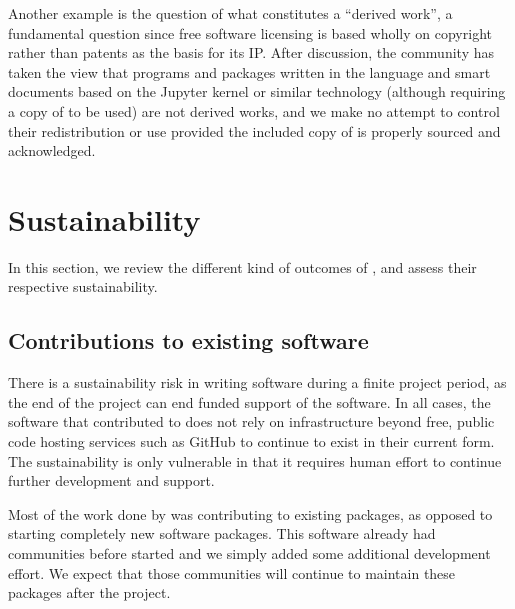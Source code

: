\documentclass{deliverablereport}
\begin{document}
Another example is the question of what constitutes a ``derived
work'', a fundamental question since free software licensing is based
wholly on copyright rather than patents as the basis for its IP. After
discussion, the \GAP community has taken the view that programs and
packages written in the \GAP language and smart documents based on
the \GAP Jupyter kernel or similar technology (although requiring a copy of
\GAP to be used) are not derived works, and we make no attempt to control
their redistribution or use  provided the included copy of \GAP is
properly sourced and acknowledged.





\section{Sustainability}

In this section, we review the different kind of outcomes of
\ODK, and assess their respective sustainability.

\subsection{Contributions to existing software}

There is a sustainability risk in writing software during a finite project period,
as the end of the project can end funded support of the software.
In all cases, the software that \ODK contributed to does not rely on infrastructure
beyond free, public code hosting services such as GitHub to continue to exist in their current form.
The sustainability is only vulnerable in that it requires human effort to continue further development and support.

Most of the work done by \ODK was contributing to existing packages,
as opposed to starting completely new software packages.
This software already had communities before \ODK started
and we simply added some additional development effort.
We expect that those communities will continue to maintain
these packages after the project.
\end{document}
